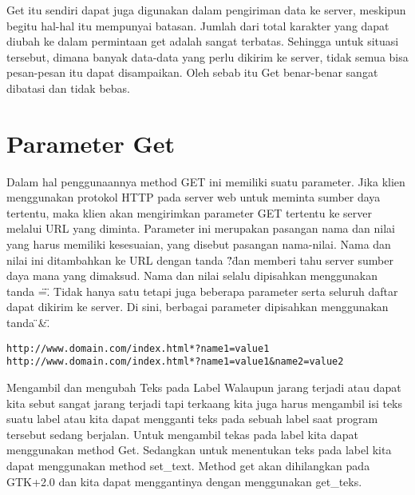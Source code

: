 Get itu sendiri dapat juga digunakan dalam pengiriman data ke server, meskipun begitu hal-hal itu mempunyai batasan. 
Jumlah dari total karakter yang dapat diubah ke dalam permintaan get adalah sangat terbatas. Sehingga untuk situasi tersebut, dimana 
banyak data-data yang perlu dikirim  ke server, tidak semua bisa pesan-pesan itu dapat disampaikan. Oleh sebab itu Get benar-benar 
sangat dibatasi dan tidak bebas.

\section{Parameter Get}
Dalam hal penggunaannya method GET ini memiliki suatu parameter. Jika klien menggunakan protokol HTTP pada server web untuk meminta 
sumber daya tertentu, maka klien akan mengirimkan parameter GET tertentu ke server melalui URL yang diminta. Parameter ini merupakan 
pasangan nama dan nilai yang harus memiliki kesesuaian, yang disebut pasangan nama-nilai.
Nama dan nilai ini ditambahkan ke URL dengan tanda \"?\" dan memberi tahu server sumber daya mana yang dimaksud. Nama dan nilai selalu dipisahkan menggunakan tanda \"=\". Tidak hanya satu tetapi juga beberapa parameter serta seluruh daftar dapat dikirim ke server. Di sini, berbagai parameter dipisahkan menggunakan tanda \"&\".
\begin{verbatim}
http://www.domain.com/index.html*?name1=value1
http://www.domain.com/index.html*?name1=value1&name2=value2
\end{verbatim}

Mengambil dan mengubah Teks pada Label
Walaupun jarang terjadi atau dapat kita sebut sangat jarang terjadi tapi terkaang kita juga harus mengambil isi teks suatu label atau 
kita dapat mengganti teks pada sebuah label saat program tersebut sedang berjalan.
Untuk mengambil tekas pada label kita dapat menggunakan method Get. Sedangkan untuk menentukan teks pada label kita dapat menggunakan 
method set_text. 
Method get akan dihilangkan pada GTK+2.0 dan kita dapat menggantinya dengan menggunakan get_teks.
